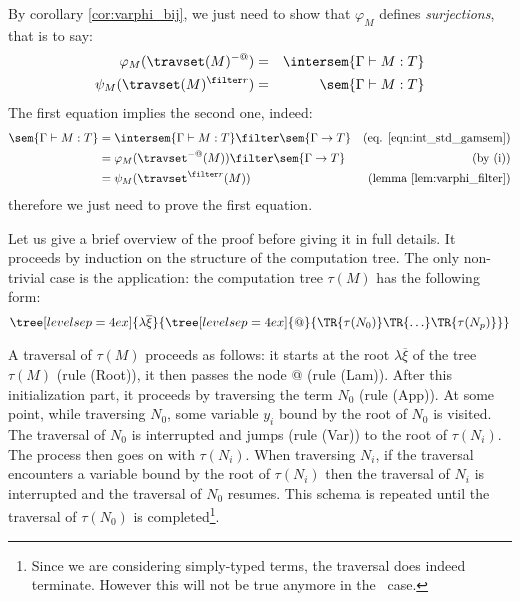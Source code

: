 \begin{remark}
\label{rem:corresp_proofreduction}
    By corollary \ref{cor:varphi_bij}, we just need to show that
    $\varphi_M$ defines \emph{surjections}, that is to
    say:
    \begin{eqnarray*}
    \varphi_M(\travset(M)^{-@}) &=& \intersem{\Gamma \vdash M : T} \\
    \psi_M(\travset(M)^{\filter r}) &=& \sem{\Gamma \vdash M :
    T}
    \end{eqnarray*}
    The first equation implies the second one, indeed:
    \begin{align*}
    \sem{\Gamma \vdash M : T} &= \intersem{\Gamma \vdash M : T} \filter \sem{\Gamma \rightarrow T} & \mbox{(eq. \ref{eqn:int_std_gamsem})} \\
            &= \varphi_M(\travset^{-@}(M)) \filter \sem{\Gamma \rightarrow T} & \mbox{(by (i))}\\
            &= \psi_M(\travset^{\filter r}(M)) & \mbox{(lemma \ref{lem:varphi_filter})}
    \end{align*}
    therefore we just need to prove the first equation.
\end{remark}

    Let us give a brief overview of the proof before giving it in full details.
    It proceeds by induction on the structure of the computation tree.
    The only non-trivial case is the application: the computation tree
    $\tau(M)$ has the following form:
        $$ \tree[levelsep=4ex]{\lambda \overline{\xi}}
            { \tree[levelsep=4ex]{@}
                {   \TR{\tau(N_0)} \TR{\ldots} \TR{\tau(N_p)}}}
        $$

    A traversal of $\tau(M)$ proceeds as follows: it starts at the root $\lambda \overline{\xi}$ of the tree $\tau(M)$ (rule
    (Root)), it then passes the node @ (rule (Lam)).
    After this initialization part, it proceeds by traversing the term $N_0$ (rule (App)).
    At some point, while traversing $N_0$, some variable $y_i$ bound by the root of $N_0$ is visited. The traversal
    of $N_0$ is interrupted and jumps (rule (Var)) to the root of $\tau(N_i)$. The process then goes on with $\tau(N_i)$.
    When traversing $N_i$, if the traversal encounters a variable bound by the root of $\tau(N_i)$ then the traversal of $N_i$
    is interrupted and
    the traversal of $N_0$ resumes.  This schema is repeated until the traversal of $\tau(N_0)$ is completed\footnote{Since we are considering
    simply-typed terms, the traversal does indeed terminate. However this will not be true anymore in the \pcf\ case.}.

